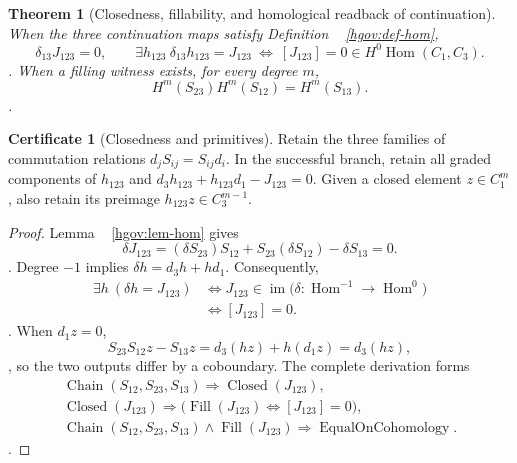 \documentclass[12pt,a4paper,openany,notitlepage]{report}
\theoremstyle{plain}
\newtheorem{theorem}{Theorem}[chapter]
\theoremstyle{definition}
\newtheorem*{certificate}{Certificate}
\theoremstyle{remark}
\begin{document}
\begin{CJK*}
\begin{theorem} [Closedness, fillability, and homological readback of continuation]
\label{hgov:thm-filler}
When the three continuation maps satisfy Definition ~ \ref{hgov:def-hom},
\[
 \delta_{13}J_{123}=0,
 \qquad
 \exists h_{123}\ \delta_{13}h_{123}=J_{123}
 \ \Longleftrightarrow\
 [J_{123}]=0\in H^0\operatorname{Hom}(C_1,C_3).
\].
When a filling witness exists, for every degree $m$,
\[
 H^m(S_{23})H^m(S_{12})=H^m(S_{13}).
\].
\end{theorem}
\begin{certificate} [Closedness and primitives]
Retain the three families of commutation relations $d_jS_{ij}=S_{ij}d_i$. In the successful branch, retain all graded components of $h_{123}$ and $d_3h_{123}+h_{123}d_1-J_{123}=0$. Given a closed element $z\in C_1^m$, also retain its preimage $h_{123}z\in C_3^{m-1}$.
\end{certificate}
\begin{proof}
Lemma ~ \ref{hgov:lem-hom} gives
\[
 \delta J_{123}
 =(\delta S_{23})S_{12}+S_{23}(\delta S_{12})
   -\delta S_{13}=0.
\].
Degree $-1$ implies
$\delta h=d_3h+h d_1$.
Consequently,
\[
 \begin{aligned}
 \exists h\ (\delta h=J_{123})
 &\Longleftrightarrow
 J_{123}\in\operatorname{im}
 \bigl(\delta:\operatorname{Hom}^{-1}\to\operatorname{Hom}^{0}\bigr)\\
 &\Longleftrightarrow [J_{123}]=0.
 \end{aligned}
\].
When $d_1z=0$,
\[
 S_{23}S_{12}z-S_{13}z
 =d_3(hz)+h(d_1z)=d_3(hz),
\],
so the two outputs differ by a coboundary. The complete derivation forms
\[
 \begin{gathered}
 \operatorname{Chain}(S_{12},S_{23},S_{13})
 \Longrightarrow\operatorname{Closed}(J_{123}),\\
 \operatorname{Closed}(J_{123})
 \Longrightarrow
 \bigl(\operatorname{Fill}(J_{123})\Longleftrightarrow[J_{123}]=0\bigr),\\
 \operatorname{Chain}(S_{12},S_{23},S_{13})
 \wedge\operatorname{Fill}(J_{123})
 \Longrightarrow\operatorname{EqualOnCohomology}.
 \end{gathered}
\].
\end{proof}


\end{CJK*}
\end{document}

